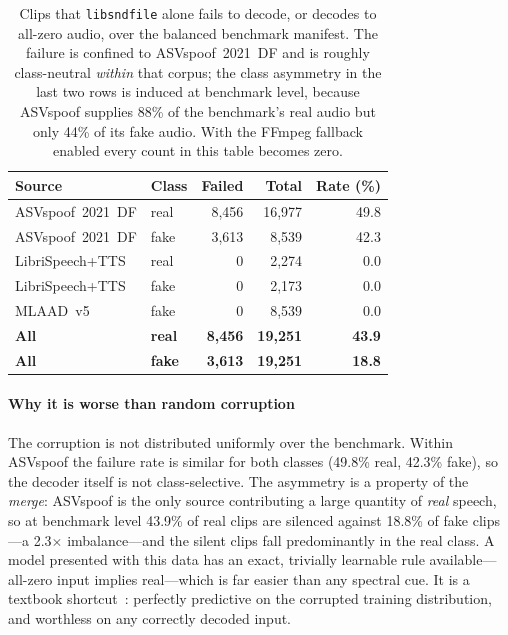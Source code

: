 \documentclass[sn-mathphys-num,pdflatex]{sn-jnl}
\begin{document}
\begin{table}[t]
\centering
\caption{Clips that \texttt{libsndfile} alone fails to decode, or decodes to
all-zero audio, over the balanced benchmark manifest. The failure is confined to
ASVspoof~2021~DF and is roughly class-neutral \emph{within} that corpus; the
class asymmetry in the last two rows is induced at benchmark level, because
ASVspoof supplies 88\% of the benchmark's real audio but only 44\% of its fake
audio. With the FFmpeg fallback enabled every count in this table becomes zero.}
\label{tab:decoder}
\small\setlength{\tabcolsep}{5pt}
\begin{tabular}{@{}llrrr@{}}
\toprule
Source & Class & Failed & Total & Rate (\%) \\
\midrule
ASVspoof~2021~DF   & real & 8{,}456 & 16{,}977 & 49.8 \\
ASVspoof~2021~DF   & fake & 3{,}613 &  8{,}539 & 42.3 \\
LibriSpeech+TTS    & real &       0 &  2{,}274 &  0.0 \\
LibriSpeech+TTS    & fake &       0 &  2{,}173 &  0.0 \\
MLAAD~v5           & fake &       0 &  8{,}539 &  0.0 \\
\midrule
\textbf{All}       & \textbf{real} & \textbf{8{,}456} & \textbf{19{,}251} & \textbf{43.9} \\
\textbf{All}       & \textbf{fake} & \textbf{3{,}613} & \textbf{19{,}251} & \textbf{18.8} \\
\bottomrule
\end{tabular}
\end{table}

\paragraph{Why it is worse than random corruption}
The corruption is not distributed uniformly over the benchmark. Within ASVspoof
the failure rate is similar for both classes (49.8\% real, 42.3\% fake), so the
decoder itself is not class-selective. The asymmetry is a property of the
\emph{merge}: ASVspoof is the only source contributing a large quantity of
\emph{real} speech, so at benchmark level 43.9\% of real clips are silenced
against 18.8\% of fake clips---a 2.3$\times$ imbalance---and the silent clips
fall predominantly in the real class. A model presented with this data has
an exact, trivially learnable rule available---all-zero input implies
real---which is far easier than any spectral cue. It is a textbook
shortcut~\cite{shortcut}: perfectly predictive on the corrupted training
distribution, and worthless on any correctly decoded input.
\end{document}
